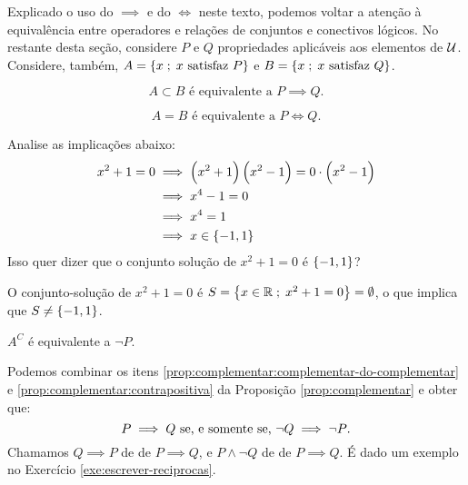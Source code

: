 Explicado o uso do $\implies$  e do $\iff$ neste texto, podemos voltar a atenção à equivalência entre operadores e relações de conjuntos e conectivos lógicos.
No restante desta seção, considere $P$ e $Q$ propriedades aplicáveis aos elementos de $\mathcal{U}$.
Considere, também, $A = \set {x \;;\;x \text{ satisfaz } P}$ e $B= \set {x \;;\;x \text{ satisfaz } Q}$.

\begin{equivalence} 
$$ A \subset B \text{ é equivalente a } P \implies Q \text{.} $$
\end{equivalence}

\begin{equivalence} 
$$ A = B \text{ é equivalente a } P \iff Q \text{.} $$
\end{equivalence}

\begin{example}
Analise as implicações abaixo:
\begin{equation*}
\begin{aligned}
x^2+1=0 & \implies \left(x^2 +1 \right) \left( x^2-1 \right) = 0
\cdot \left( x^2-1 \right) \\
& \implies x^4 - 1 = 0 \\
& \implies x^4 = 1 \\
& \implies x \in \set {-1, 1}
\end{aligned}
\end{equation*}
%
Isso quer dizer que o conjunto solução de $x^2 +1 = 0$ é $\set{-1, 1}$?
\end{example}

\begin{solution}
O conjunto-solução de $x^2 + 1 = 0$ é $S = \set{x \in \mathbb{R}\;;\;x^2 + 1 = 0} = \emptyset$, o que implica que $S \ne \set{-1,1}$.
\end{solution}

\begin{equivalence} 
$A^C$ é equivalente a $\neg P$.
\end{equivalence}
Podemos combinar os itens \ref{prop:complementar:complementar-do-complementar} e \ref{prop:complementar:contrapositiva} da Proposição \ref{prop:complementar} e obter que:
%
$$ P \implies Q \text{ se, e somente se, } \neg Q \implies \neg P \text{.} $$
%
Chamamos $Q \implies P$ de  de $P \implies Q$, e $P \land \neg Q$ de \newline de $P \implies Q$. É dado um exemplo no Exercício \ref{exe:escrever-reciprocas}.

